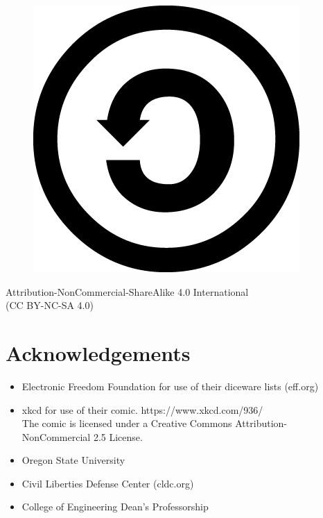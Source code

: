 \documentclass[10pt, oneside]{book}
\begin{document}
\begin{figure}[h]
	\includegraphics[scale=0.1]{sa.png}
\end{figure}
	Attribution-NonCommercial-ShareAlike 4.0 International\\ (CC BY-NC-SA 4.0)
	\section*{Acknowledgements}
	\begin{itemize}
		\item Electronic Freedom Foundation for use of their diceware lists (eff.org)\\
		\item xkcd for use of their comic. https://www.xkcd.com/936/\\
		The comic is licensed under a Creative Commons Attribution-NonCommercial 2.5 License.
		\item Oregon State University\\
		\item Civil Liberties Defense Center (cldc.org)\\
		\item College of Engineering Dean's Professorship\\
	\end{itemize}
	
\end{document}
